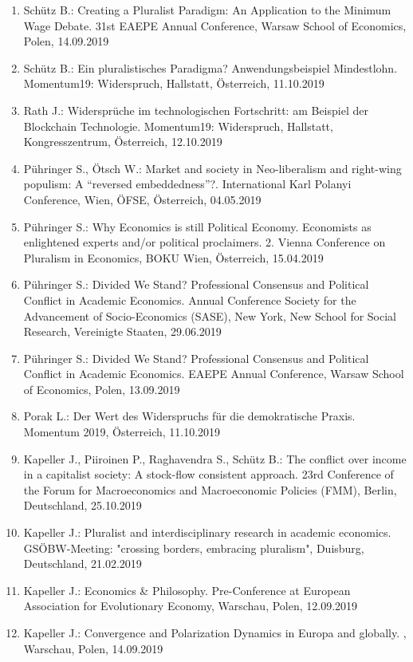 \begin{enumerate}
	\item Schütz B.: Creating a Pluralist Paradigm: An Application to the Minimum Wage Debate. 31st EAEPE Annual Conference, Warsaw School of Economics, Polen, 14.09.2019
	\item Schütz B.: Ein pluralistisches Paradigma? Anwendungsbeispiel Mindestlohn. Momentum19: Widerspruch, Hallstatt, Österreich, 11.10.2019
	\item Rath J.: Widersprüche im technologischen Fortschritt: am Beispiel der Blockchain Technologie. Momentum19: Widerspruch, Hallstatt, Kongresszentrum, Österreich, 12.10.2019
	\item Pühringer S., Ötsch W.: Market and society in Neo-liberalism and right-wing populism: A “reversed embeddedness”?. International Karl Polanyi Conference, Wien, ÖFSE, Österreich, 04.05.2019
	\item Pühringer S.: Why Economics is still Political Economy. Economists as enlightened experts and/or political proclaimers. 2. Vienna Conference on Pluralism in Economics, BOKU Wien, Österreich, 15.04.2019
	\item Pühringer S.: Divided We Stand? Professional Consensus and Political Conflict in Academic Economics. Annual Conference Society for the Advancement of Socio-Economics (SASE), New York, New School for Social Research, Vereinigte Staaten, 29.06.2019
	\item Pühringer S.: Divided We Stand? Professional Consensus and Political Conflict in Academic Economics. EAEPE Annual Conference, Warsaw School of Economics, Polen, 13.09.2019
	\item Porak L.: Der Wert des Widerspruchs für die demokratische Praxis. Momentum 2019, Österreich, 11.10.2019
	\item Kapeller J., Piiroinen P., Raghavendra S., Schütz B.: The conflict over income in a capitalist society: A stock-flow consistent approach. 23rd Conference of the Forum for Macroeconomics and Macroeconomic Policies (FMM), Berlin, Deutschland, 25.10.2019
	\item Kapeller J.: Pluralist and interdisciplinary research in academic economics. GSÖBW-Meeting: "crossing borders, embracing pluralism", Duisburg, Deutschland, 21.02.2019
	\item Kapeller J.: Economics \& Philosophy. Pre-Conference at European Association for Evolutionary Economy, Warschau, Polen, 12.09.2019
	\item Kapeller J.: Convergence and Polarization Dynamics in Europa and globally. , Warschau, Polen, 14.09.2019

\end{enumerate}
